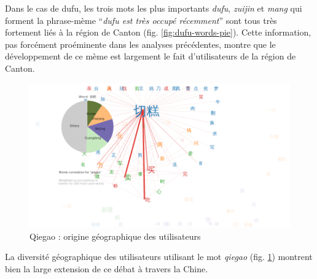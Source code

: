Dans le cas de dufu, les trois mots les plus importants \textit{dufu}, \textit{zuijin} et \textit{mang} qui forment la phrase-mème ``\textit{dufu est très occupé récemment}'' sont tous très fortement liés \`a la région de Canton (fig. \ref{fig:dufu-words-pie}). Cette information, pas forcément proéminente dans les analyses précédentes, montre que le développement de ce mème est largement le fait d{\textquoteright}utilisateurs de la région de Canton.

\begin{figure}[h!]
    \centering
    \includegraphics[scale=0.3]{figures/chap4/words_pie_qiegao_Nov_19_2012_Dec_16_2012}
    \caption{
      Qiegao : origine géographique des utilisateurs
    }
    \label{fig:qiegao-words-pie}
\end{figure}

La diversité géographique des utilisateurs utilisant le mot \textit{qiegao} (fig. \ref{fig:qiegao-words-pie}) montrent bien la large extension de ce débat à travers la Chine.